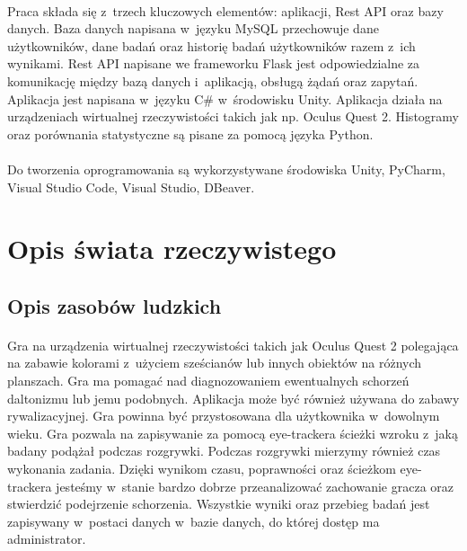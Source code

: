 \documentclass[12pt, letterpaper]{article}
\begin{document}
\paragraph{}
Praca składa się z~trzech kluczowych elementów: aplikacji, Rest API oraz bazy danych. Baza danych napisana w~języku MySQL przechowuje dane użytkowników, dane badań oraz historię badań użytkowników razem z~ich wynikami. Rest API napisane we frameworku Flask jest odpowiedzialne za komunikację między bazą danych i~aplikacją, obsługą żądań oraz zapytań. Aplikacja jest napisana w~języku C# w~środowisku Unity. Aplikacja działa na urządzeniach wirtualnej rzeczywistości takich jak np. Oculus Quest 2. Histogramy oraz porównania statystyczne są pisane za pomocą języka Python.

\paragraph{}
Do tworzenia oprogramowania są wykorzystywane środowiska Unity, PyCharm, Visual Studio Code, Visual Studio, DBeaver.

\newpage
\section{Opis świata rzeczywistego}
\subsection{Opis zasobów ludzkich}
\paragraph{}
Gra na urządzenia wirtualnej rzeczywistości takich jak Oculus Quest 2 polegająca na zabawie kolorami z~użyciem sześcianów lub innych obiektów na różnych planszach. Gra ma pomagać nad diagnozowaniem ewentualnych schorzeń daltonizmu lub jemu podobnych. Aplikacja może być również używana do zabawy rywalizacyjnej. Gra powinna być przystosowana dla użytkownika w~dowolnym wieku. Gra pozwala na zapisywanie za pomocą eye-trackera ścieżki wzroku z~jaką badany podążał podczas rozgrywki. Podczas rozgrywki mierzymy również czas wykonania zadania. Dzięki wynikom czasu, poprawności oraz ścieżkom eye-trackera jesteśmy w~stanie bardzo dobrze przeanalizować zachowanie gracza oraz stwierdzić podejrzenie schorzenia. Wszystkie wyniki oraz przebieg badań jest zapisywany w~postaci danych w~bazie danych, do której dostęp ma administrator.
	
\end{document}
